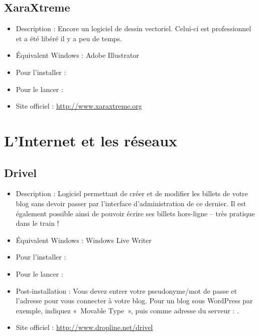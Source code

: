 \subsection{XaraXtreme}
\label{RefXaraXtreme}
\begin{itemize}
\begingroup
{}
\item Description : Encore un logiciel de dessin vectoriel. Celui-ci est professionnel et a été libéré il y a peu de temps.{\par}
\item Équivalent Windows : Adobe Illustrator{\par}
\item Pour l'installer : 
\item Pour le lancer : 
\item Site officiel : \url{http://www.xaraxtreme.org}{\par}
\endgroup
\end{itemize}

\section{L'Internet et les réseaux}
\subsection{Drivel}
\begin{itemize}
\begingroup
{}
\item Description : Logiciel permettant de créer et de modifier les billets de votre blog sans devoir passer par l'interface d'administration de ce dernier. Il est également possible ainsi de pouvoir écrire ses billets hors-ligne -- très pratique dans le train !{\par}
\endgroup
\item Équivalent Windows : Windows Live Writer{\par}
\item Pour l'installer : 
\item Pour le lancer : 
\item Post-installation : Vous devez entrer votre pseudonyme/mot de passe et l'adresse pour vous connecter à votre blog. Pour un blog sous WordPress par exemple, indiquez «~Movable Type~», puis comme adresse du serveur : .{\par}
\item Site officiel : \url{http://www.dropline.net/drivel}{\par}
\end{itemize}
